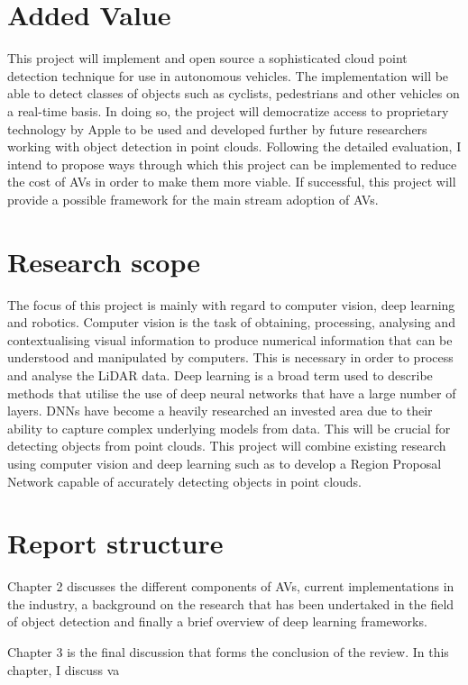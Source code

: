 \section{Added Value}

This project will implement and open source a sophisticated cloud point detection technique for use in autonomous vehicles. The implementation will be able to detect classes of objects such as cyclists, pedestrians and other vehicles on a real-time basis.
In doing so, the project will democratize access to proprietary technology by Apple \cite{zhou2017voxelnet} to be used and developed further by future researchers working with object detection in point clouds. 
Following the detailed evaluation, I intend to propose ways through which this project can be implemented to reduce the cost of AVs in order to make them more viable. 
If successful, this project will provide a possible framework for the main stream adoption of AVs. 

\section{Research scope}
The focus of this project is mainly with regard to computer vision, deep learning and robotics. Computer vision is the task of obtaining, processing, analysing and contextualising visual information to produce numerical information that can be understood and manipulated by computers. This is necessary in order to process and analyse the LiDAR data. Deep learning is a broad term used to describe methods that utilise the use of deep neural networks that have a large number of layers. DNNs have become a heavily researched an invested area due to their ability to capture complex underlying models from data. This will be crucial for detecting objects from point clouds. 
This project will combine existing research using computer vision and deep learning such as \cite{qi2017pointnet}\cite{zhou2017voxelnet} to develop a Region Proposal Network capable of accurately detecting objects in point clouds. 

\section{Report structure}

Chapter 2 discusses the different components of AVs, current implementations in the industry, a background on the research that has been undertaked in the field of object detection and finally a brief overview of deep learning frameworks. 

Chapter 3 is the final discussion that forms the conclusion of the review. In this chapter, I discuss va



